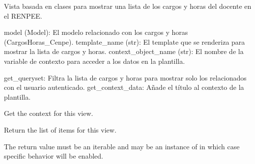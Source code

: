\documentclass[letterpaper,10pt,spanish]{sphinxmanual}
\begin{document}
\begin{fulllineitems}

\pysigstartsignatures
{}
\pysigstopsignatures
\sphinxAtStartPar
Vista basada en clases para mostrar una lista de los cargos y horas del docente en el RENPEE.
\begin{description}
\sphinxAtStartPar
model (Model): El modelo relacionado con los cargos y horas (CargosHoras\_Cenpe).
template\_name (str): El template que se renderiza para mostrar la lista de cargos y horas.
context\_object\_name (str): El nombre de la variable de contexto para acceder a los datos en la plantilla.

\sphinxAtStartPar
get\_queryset: Filtra la lista de cargos y horas para mostrar solo los relacionados con el usuario autenticado.
get\_context\_data: Añade el título al contexto de la plantilla.

\end{description}


\begin{fulllineitems}

\pysigstartsignatures
{}
\pysigstopsignatures
\end{fulllineitems}



\begin{fulllineitems}

\pysigstartsignatures
{}
\pysigstopsignatures
\sphinxAtStartPar
Get the context for this view.

\end{fulllineitems}



\begin{fulllineitems}

\pysigstartsignatures
{}
\pysigstopsignatures
\sphinxAtStartPar
Return the list of items for this view.

\sphinxAtStartPar
The return value must be an iterable and may be an instance of
 in which case  specific behavior will be enabled.


\end{fulllineitems}
\end{fulllineitems}
\end{document}
